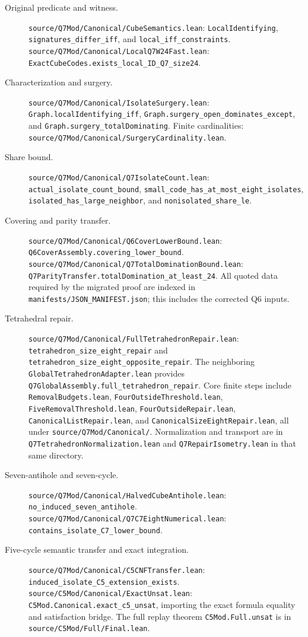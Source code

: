 \documentclass[11pt]{article}
\theoremstyle{definition}\newtheorem{definition}[theorem]{Definition}
\theoremstyle{remark}\newtheorem{remark}[theorem]{Remark}
\newcommand{\src}[1]{{\small\nolinkurl{#1}}}
\begin{document}
\begin{description}
\item[Original predicate and witness.]
\src{source/Q7Mod/Canonical/CubeSemantics.lean}: \src{LocalIdentifying}, \src{signatures_differ_iff}, and \src{local_iff_constraints}.
\src{source/Q7Mod/Canonical/LocalQ7W24Fast.lean}: \src{ExactCubeCodes.exists_local_ID_Q7_size24}.

\item[Characterization and surgery.]
\src{source/Q7Mod/Canonical/IsolateSurgery.lean}: \src{Graph.localIdentifying_iff}, \src{Graph.surgery_open_dominates_except}, and \src{Graph.surgery_totalDominating}.
Finite cardinalities: \src{source/Q7Mod/Canonical/SurgeryCardinality.lean}.

\item[Share bound.]
\src{source/Q7Mod/Canonical/Q7IsolateCount.lean}: \src{actual_isolate_count_bound}, \src{small_code_has_at_most_eight_isolates}, \src{isolated_has_large_neighbor}, and \src{nonisolated_share_le}.

\item[Covering and parity transfer.]
\src{source/Q7Mod/Canonical/Q6CoverLowerBound.lean}: \src{Q6CoverAssembly.covering_lower_bound}.
\src{source/Q7Mod/Canonical/Q7TotalDominationBound.lean}: \src{Q7ParityTransfer.totalDomination_at_least_24}.
All quoted data required by the migrated proof are indexed in \src{manifests/JSON_MANIFEST.json}; this includes the corrected Q6 inputs.

\item[Tetrahedral repair.]
\src{source/Q7Mod/Canonical/FullTetrahedronRepair.lean}: \src{tetrahedron_size_eight_repair} and \src{tetrahedron_size_eight_opposite_repair}.
The neighboring \src{GlobalTetrahedronAdapter.lean} provides \src{Q7GlobalAssembly.full_tetrahedron_repair}.
Core finite steps include \src{RemovalBudgets.lean}, \src{FourOutsideThreshold.lean}, \src{FiveRemovalThreshold.lean}, \src{FourOutsideRepair.lean}, \src{CanonicalListRepair.lean}, and \src{CanonicalSizeEightRepair.lean}, all under \src{source/Q7Mod/Canonical/}.
Normalization and transport are in \src{Q7TetrahedronNormalization.lean} and \src{Q7RepairIsometry.lean} in that same directory.

\item[Seven-antihole and seven-cycle.]
\src{source/Q7Mod/Canonical/HalvedCubeAntihole.lean}: \src{no_induced_seven_antihole}.
\src{source/Q7Mod/Canonical/Q7C7EightNumerical.lean}: \src{contains_isolate_C7_lower_bound}.

\item[Five-cycle semantic transfer and exact integration.]
\src{source/Q7Mod/Canonical/C5CNFTransfer.lean}: \src{induced_isolate_C5_extension_exists}.
\src{source/C5Mod/Canonical/ExactUnsat.lean}: \src{C5Mod.Canonical.exact_c5_unsat}, importing the exact formula equality and satisfaction bridge.
The full replay theorem \src{C5Mod.Full.unsat} is in \src{source/C5Mod/Full/Final.lean}.


\end{description}
\end{document}
